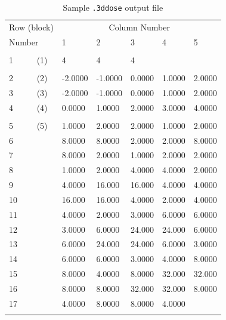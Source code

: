 \documentclass[12pt,twoside]{article}      %
\begin{document}
\footnotesize			%
\begin{table}[htbp]
\begin{center}
\vspace*{-0.5cm}
\caption{Sample {\tt .3ddose} output file}
\vspace*{-0.5cm}
\begin{tabular}[t]{||p{1.5cm}|p{2.5cm}|p{2.5cm}|p{2.5cm}|p{2.5cm}|p{2.5cm}||} \hline\hline
Row (block)& \multicolumn{5}{c||}{Column Number} \\ \cline{2-6}

Number &  1 &        2 &         3       & 4      &  5 \\ \hline
& & & & & \\

1 ~~~~~(1) &    4       &      4       &    4  &  & \\
& & & & & \\

2 ~~~~~(2) &   -2.0000 &    -1.0000 &    0.0000 &    1.0000 &   2.0000 \\
3 ~~~~~(3) &   -2.0000 &    -1.0000 &    0.0000 &    1.0000 &   2.0000  \\
4 ~~~~~(4) &    0.0000 &     1.0000 &    2.0000 &    3.0000 &   4.0000 \\
& & & & & \\

5 ~~~~~(5) &     1.0000 &    2.0000 &    2.0000 &    1.0000 &    2.0000\\
6 &     8.0000 &    8.0000 &    2.0000  &   2.0000 &    8.0000\\
7 &     8.0000 &    2.0000 &    1.0000 &    2.0000 &    2.0000\\
8 &     1.0000 &    2.0000 &    4.0000 &    4.0000 &    2.0000\\
9 &     4.0000 &    16.000 &    16.000 &    4.0000 &    4.0000 \\
10 &    16.000 &    16.000 &    4.0000 &    2.0000 &    4.0000 \\
11 &    4.0000 &    2.0000 &    3.0000 &    6.0000  &   6.0000\\
12 &    3.0000 &    6.0000 &    24.000 &    24.000 &    6.0000  \\
13 &    6.0000 &    24.000 &    24.000 &    6.0000 &    3.0000   \\
14 &    6.0000 &    6.0000 &    3.0000 &    4.0000 &    8.0000 \\
15 &    8.0000 &    4.0000  &   8.0000 &    32.000 &    32.000\\
16 &    8.0000 &    8.0000 &    32.000 &    32.000 &    8.0000 \\
17 &    4.0000 &    8.0000 &    8.0000 &    4.0000 &  \\
& & & & & \\


\end{tabular}
\end{center}
\end{table}
\end{document}
